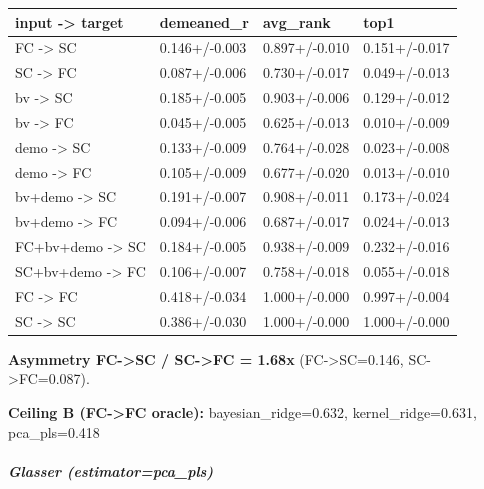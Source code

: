 {\def\LTcaptype{none} %
\begin{longtable}[]{@{}llll@{}}
\toprule\noalign{}
input -\textgreater{} target & demeaned\_r & avg\_rank & top1 \\
\midrule\noalign{}
\endhead
\bottomrule\noalign{}
\endlastfoot
FC -\textgreater{} SC & 0.146+/-0.003 & 0.897+/-0.010 & 0.151+/-0.017 \\
SC -\textgreater{} FC & 0.087+/-0.006 & 0.730+/-0.017 & 0.049+/-0.013 \\
bv -\textgreater{} SC & 0.185+/-0.005 & 0.903+/-0.006 & 0.129+/-0.012 \\
bv -\textgreater{} FC & 0.045+/-0.005 & 0.625+/-0.013 & 0.010+/-0.009 \\
demo -\textgreater{} SC & 0.133+/-0.009 & 0.764+/-0.028 & 0.023+/-0.008 \\
demo -\textgreater{} FC & 0.105+/-0.009 & 0.677+/-0.020 & 0.013+/-0.010 \\
bv+demo -\textgreater{} SC & 0.191+/-0.007 & 0.908+/-0.011 & 0.173+/-0.024 \\
bv+demo -\textgreater{} FC & 0.094+/-0.006 & 0.687+/-0.017 & 0.024+/-0.013 \\
FC+bv+demo -\textgreater{} SC & 0.184+/-0.005 & 0.938+/-0.009 & 0.232+/-0.016 \\
SC+bv+demo -\textgreater{} FC & 0.106+/-0.007 & 0.758+/-0.018 & 0.055+/-0.018 \\
FC -\textgreater{} FC & 0.418+/-0.034 & 1.000+/-0.000 & 0.997+/-0.004 \\
SC -\textgreater{} SC & 0.386+/-0.030 & 1.000+/-0.000 & 1.000+/-0.000 \\
\end{longtable}
}

\textbf{Asymmetry FC-\textgreater SC / SC-\textgreater FC = 1.68x} (FC-\textgreater SC=0.146, SC-\textgreater FC=0.087).

\textbf{Ceiling B (FC-\textgreater FC oracle):} bayesian\_ridge=0.632, kernel\_ridge=0.631, pca\_pls=0.418

\subparagraph{Glasser (estimator=pca\_pls)}\label{glasser-estimatorpca_pls}

